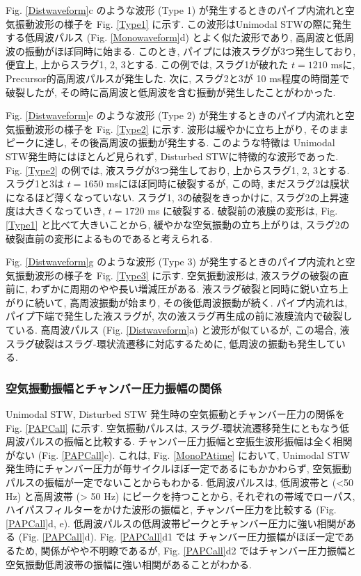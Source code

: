 \documentclass[12pt]{article}
\begin{document}
Fig. \ref{Distwaveform}c のような波形 (Type 1) が発生するときのパイプ内流れと空気振動波形の様子を Fig. \ref{Type1} に示す. この波形はUnimodal STWの際に発生する低周波パルス (Fig. \ref{Monowaveform}d) とよく似た波形であり, 高周波と低周波の振動がほぼ同時に始まる. このとき, パイプには液スラグが3つ発生しており, 便宜上, 上からスラグ1, 2, 3とする. この例では, スラグ1が破れた $t=1210$ msに, Precursor的高周波パルスが発生した. 次に, スラグ2と3が 10 ms程度の時間差で破裂したが, その時に高周波と低周波を含む振動が発生したことがわかった.

Fig. \ref{Distwaveform}e のような波形 (Type 2) が発生するときのパイプ内流れと空気振動波形の様子を Fig. \ref{Type2} に示す. 波形は緩やかに立ち上がり, そのままピークに達し, その後高周波の振動が発生する. このような特徴は Unimodal STW発生時にはほとんど見られず, Disturbed STWに特徴的な波形であった. Fig. \ref{Type2} の例では, 液スラグが3つ発生しており, 上からスラグ1, 2, 3とする. スラグ1と3は $t=1650$ msにほぼ同時に破裂するが, この時, まだスラグ2は膜状になるほど薄くなっていない. スラグ1, 3の破裂をきっかけに, スラグ2の上昇速度は大きくなっていき, $t=1720$ ms に破裂する. 破裂前の液膜の変形は, Fig. \ref{Type1} と比べて大きいことから, 緩やかな空気振動の立ち上がりは, スラグ2の破裂直前の変形によるものであると考えられる.

Fig. \ref{Distwaveform}g のような波形 (Type 3) が発生するときのパイプ内流れと空気振動波形の様子を Fig. \ref{Type3} に示す. 空気振動波形は, 液スラグの破裂の直前に, わずかに周期のやや長い増減圧がある. 液スラグ破裂と同時に鋭い立ち上がりに続いて, 高周波振動が始まり, その後低周波振動が続く. パイプ内流れは, パイプ下端で発生した液スラグが, 次の液スラグ再生成の前に液膜流内で破裂している. 高周波パルス (Fig. \ref{Distwaveform}a) と波形が似ているが, この場合, 液スラグ破裂はスラグ-環状流遷移に対応するために, 低周波の振動も発生している.


\clearpage
\subsubsection{空気振動振幅とチャンバー圧力振幅の関係}\label{AcoChp}
 Unimodal STW, Disturbed STW 発生時の空気振動とチャンバー圧力の関係を Fig. \ref{PAPCall} に示す. 空気振動パルスは, スラグ-環状流遷移発生にともなう低周波パルスの振幅と比較する. チャンバー圧力振幅と空振生波形振幅は全く相関がない (Fig. \ref{PAPCall}c). これは, Fig. \ref{MonoPAtime} において, Unimodal STW 発生時にチャンバー圧力が毎サイクルほぼ一定であるにもかかわらず, 空気振動パルスの振幅が一定でないことからもわかる. 低周波パルスは, 低周波帯と (<50 Hz) と高周波帯 (> 50 Hz) にピークを持つことから, それぞれの帯域でローパス, ハイパスフィルターをかけた波形の振幅と, チャンバー圧力を比較する (Fig. \ref{PAPCall}d, e). 低周波パルスの低周波帯ピークとチャンバー圧力に強い相関がある (Fig. \ref{PAPCall}d). Fig. \ref{PAPCall}d1 では チャンバー圧力振幅がほぼ一定であるため, 関係がやや不明瞭であるが, Fig. \ref{PAPCall}d2 ではチャンバー圧力振幅と空気振動低周波帯の振幅に強い相関があることがわかる.
\end{document}
